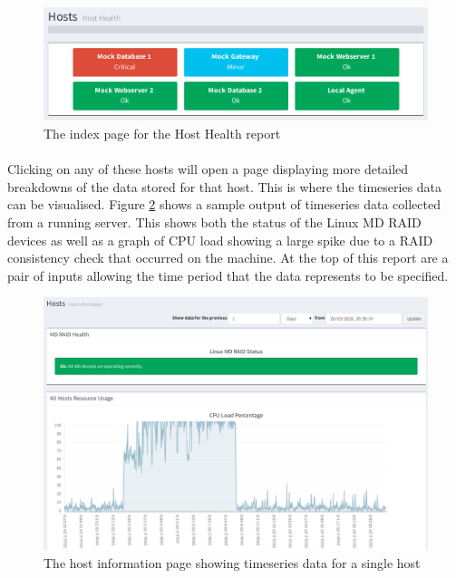 \documentclass[bsc,logo,twoside,singlespacing]{infthesis}
\begin{document}
\begin{figure}[H]
	\centering
	\caption{The index page for the Host Health report}
	\label{host-health-index}
	\includegraphics[scale=0.7]{assets/screenshots/host-health-index.pdf}
\end{figure}

\paragraph*{}
	Clicking on any of these hosts will open a page displaying more detailed
	breakdowns of the data stored for that host.  This is where the timeseries
	data can be visualised.  Figure \ref{host-information} shows a sample
	output of timeseries data collected from a running server.  This shows both
	the status of the Linux MD RAID devices as well as a graph of CPU load
	showing a large spike due to a RAID consistency check that occurred on the
	machine.  At the top of this report are a pair of inputs allowing the time
	period that the data represents to be specified.

\begin{figure}[H]
	\centering
	\caption{The host information page showing timeseries data for a single host}
	\label{host-information}
	\includegraphics[scale=0.43]{assets/screenshots/host-information.pdf}
\end{figure}
\end{document}
